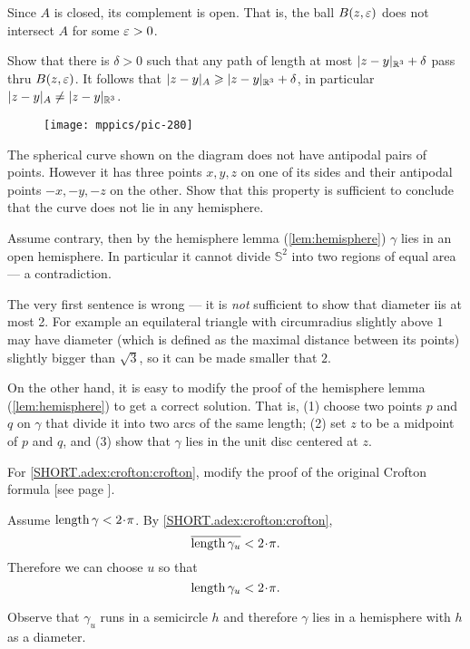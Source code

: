Since $A$ is closed, its complement is open.
That is, the ball $B(z,\varepsilon)$ does not intersect $A$ for some $\varepsilon>0$.

Show that there is $\delta>0$ such that any path of length at most $|z-y|_{\mathbb{R}^3}+\delta$ pass thru $B(z,\varepsilon)$.
It follows that $|z-y|_A\geqslant |z-y|_{\mathbb{R}^3}+\delta$, 
in particular$|z-y|_A\ne |z-y|_{\mathbb{R}^3}$.

\begin{wrapfigure}{r}{30 mm}
\vskip-0mm
\centering
\texttt{[image: mppics/pic-280]}
\vskip0mm
\end{wrapfigure}

The spherical curve shown on the diagram does not have antipodal pairs of points.
However it has three points $x,y,z$ on one of its sides and their antipodal points $-x,-y,-z$ on the other.
Show that this property is sufficient to conclude that the curve does not lie in any hemisphere.

Assume contrary, then by the hemisphere lemma (\ref{lem:hemisphere}) $\gamma$ lies in an open hemisphere.
In particular it cannot divide $\mathbb{S}^2$ into two regions of equal area --- a contradiction.

The very first sentence is wrong --- it is {}\emph{not} sufficient to show that diameter iis at most 2.
For example an equilateral triangle with circumradius slightly above $1$ may have diameter (which is defined as the maximal distance between its points) slightly bigger than $\sqrt3$, so it can be made smaller that $2$.

On the other hand, it is easy to modify the proof of the hemisphere lemma (\ref{lem:hemisphere}) to get a correct solution.
That is, (1) choose two points $p$ and $q$ on $\gamma$ that divide it into two arcs of the same length;
(2) set $z$ to be a midpoint of $p$ and $q$,
and (3) show that $\gamma$ lies in the unit disc centered at $z$.


For \ref{SHORT.adex:crofton:crofton}, modify the proof of the original Crofton formula [see page \pageref{page:crofton}].

Assume $\length \gamma<2\cdot\pi$.
By \ref{SHORT.adex:crofton:crofton},
\[\overline{\length \gamma_u}<2\cdot\pi.\]
Therefore we can choose $u$ so that 
\[\length \gamma_u<2\cdot\pi.\]

Observe that $\gamma_u$ runs in a semicircle $h$ and therefore $\gamma$ lies in a hemisphere with $h$ as a diameter.


